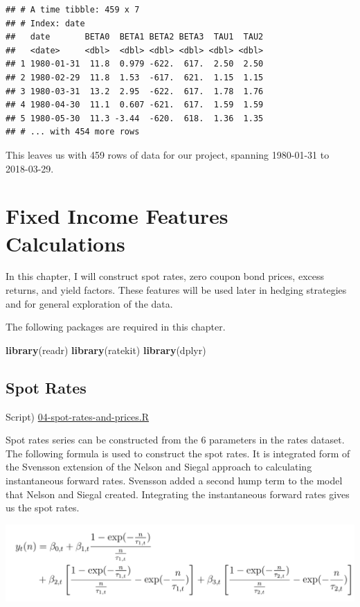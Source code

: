 \documentclass[]{book}
\newenvironment{Shaded}{\begin{snugshade}}{\end{snugshade}}
\newcommand{\KeywordTok}[1]{\textcolor[rgb]{0.13,0.29,0.53}{\textbf{#1}}}
\newcommand{\NormalTok}[1]{#1}
\theoremstyle{definition}
\theoremstyle{definition}
\theoremstyle{definition}
\theoremstyle{remark}
\begin{document}
\begin{verbatim}
## # A time tibble: 459 x 7
## # Index: date
##   date       BETA0  BETA1 BETA2 BETA3  TAU1  TAU2
##   <date>     <dbl>  <dbl> <dbl> <dbl> <dbl> <dbl>
## 1 1980-01-31  11.8  0.979 -622.  617.  2.50  2.50
## 2 1980-02-29  11.8  1.53  -617.  621.  1.15  1.15
## 3 1980-03-31  13.2  2.95  -622.  617.  1.78  1.76
## 4 1980-04-30  11.1  0.607 -621.  617.  1.59  1.59
## 5 1980-05-30  11.3 -3.44  -620.  618.  1.36  1.35
## # ... with 454 more rows
\end{verbatim}

This leaves us with 459 rows of data for our project, spanning
1980-01-31 to 2018-03-29.

\hypertarget{rates}{%
\chapter{Fixed Income Features Calculations}\label{rates}}

In this chapter, I will construct spot rates, zero coupon bond prices,
excess returns, and yield factors. These features will be used later in
hedging strategies and for general exploration of the data.

The following packages are required in this chapter.

\begin{Shaded}
\begin{Highlighting}[]
\KeywordTok{library}\NormalTok{(readr)}
\KeywordTok{library}\NormalTok{(ratekit)}
\KeywordTok{library}\NormalTok{(dplyr)}
\end{Highlighting}
\end{Shaded}

\hypertarget{spot-rates}{%
\section{Spot Rates}\label{spot-rates}}

Script)
\href{./R/04-spot-rates-and-prices.R}{04-spot-rates-and-prices.R}

Spot rates series can be constructed from the 6 parameters in the rates
dataset. The following formula is used to construct the spot rates. It
is integrated form of the Svensson extension of the Nelson and Siegal
approach to calculating instantaneous forward rates. Svensson added a
second hump term to the model that Nelson and Siegal created.
Integrating the instantaneous forward rates gives us the spot rates.

\includegraphics[width=26.67in]{images/spot-rates}
\end{document}
